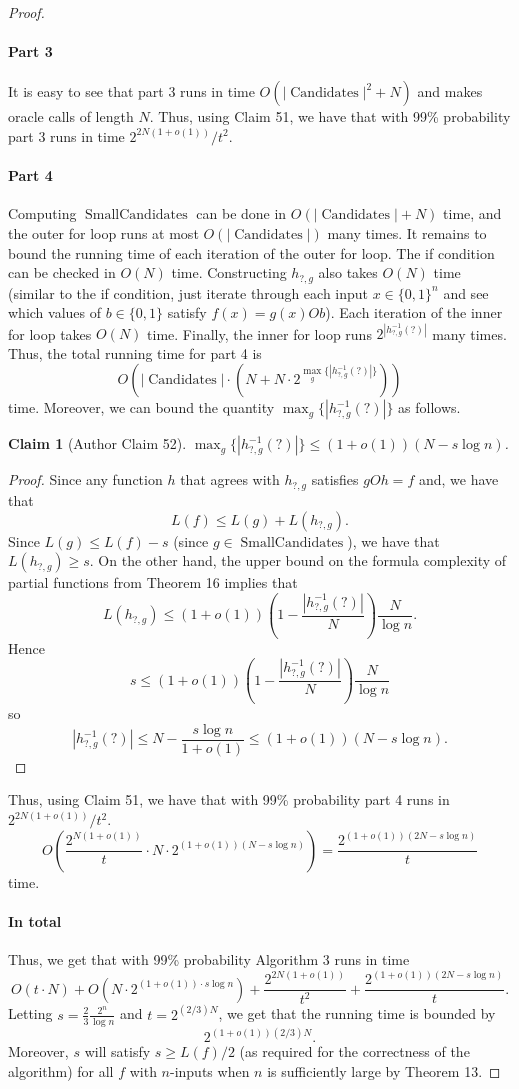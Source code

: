 \documentclass[10pt,a4paper]{article}
\newtheorem{ntclaim}[nttheorem]{Claim}
\newcommand{\Candidates}{\operatorname{Candidates}}
\begin{document}
\begin{proof}
\paragraph{Part 3}
It is easy to see that part 3 runs in time $O(|\Candidates|^2+N)$ and makes oracle calls of length $N$.
Thus, using Claim 51, we have that with 99\% probability part 3 runs in time $2^{2N(1+o(1))}/t^2$.
\paragraph{Part 4}
Computing $\operatorname{SmallCandidates}$ can be done in $O(|\Candidates|+N)$ time, and the outer for loop runs at most $O(|\Candidates|)$ many times.
It remains to bound the running time of each iteration of the outer for loop. The if condition can be checked in $O(N)$ time. Constructing $h_{?,g}$ also takes $O(N)$ time (similar to the if condition, just iterate through each input $x\in\{0,1\}^n$ and see which values of $b\in\{0,1\}$ satisfy $f(x)=g(x)Ob$). Each iteration of the inner for loop takes $O(N)$ time. Finally, the inner for loop runs $2^{|h_{?,g}^{-1}(?)|}$ many times.
Thus, the total running time for part 4 is
\[O\left(|\Candidates|\cdot\left(N+N\cdot 2^{\max_g\{|h_{?,g}^{-1}(?)|\}}\right)\right)\]
time.
Moreover, we can bound the quantity $\max_g\{|h_{?,g}^{-1}(?)|\}$ as follows.
\begin{ntclaim}[Author Claim 52]
$\max_g\{|h_{?,g}^{-1}(?)|\}\leq(1+o(1))(N-s\log n)$.
\end{ntclaim}
\begin{proof}
Since any function $h$ that agrees with $h_{?,g}$ satisfies $gOh=f$ and, we have that
\[L(f)\leq L(g)+L(h_{?,g}).\]
Since $L(g)\leq L(f)-s$ (since $g\in\operatorname{SmallCandidates}$), we have that $L(h_{?,g})\geq s$.
On the other hand, the upper bound on the formula complexity of partial functions from Theorem 16 implies that
\[L(h_{?,g})\leq(1+o(1))\left(1-\frac{|h_{?,g}^{-1}(?)|}N\right)\frac N{\log n}.\]
Hence
\[s\leq(1+o(1))\left(1-\frac{|h_{?,g}^{-1}(?)|}N\right)\frac N{\log n}\]
so
\[|h_{?,g}^{-1}(?)|\leq N-\frac{s\log n}{1+o(1)}\leq(1+o(1))(N-s\log n).\]
\end{proof}
Thus, using Claim 51, we have that with 99\% probability part 4 runs in $2^{2N(1+o(1))}/t^2$.
\[O\left(\frac{2^{N(1+o(1))}}t\cdot N\cdot 2^{(1+o(1))(N-s\log n)}\right)=\frac{2^{(1+o(1))(2N-s\log n)}}t\]
time.
\paragraph{In total}
Thus, we get that with 99\% probability Algorithm 3 runs in time
\[O(t\cdot N)+O(N\cdot 2^{(1+o(1))\cdot s\log n})+\frac{2^{2N(1+o(1))}}{t^2}+\frac{2^{(1+o(1))(2N-s\log n)}}t.\]
Letting $s=\frac 23\frac{2^n}{\log n}$ and $t=2^{(2/3)N}$, we get that the running time is bounded by
\[2^{(1+o(1))(2/3)N}.\]
Moreover, $s$ will satisfy $s\geq L(f)/2$ (as required for the correctness of the algorithm) for all $f$ with $n$-inputs when $n$ is sufficiently large by Theorem 13.
\end{proof}
\end{document}
